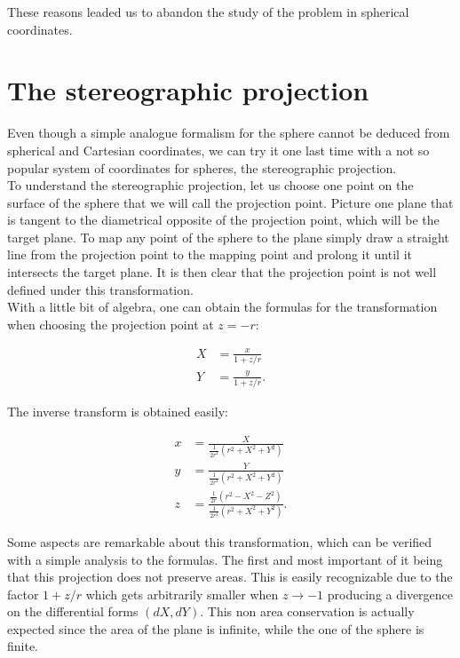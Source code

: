 These reasons leaded us to abandon the study of the problem in spherical coordinates.\\


\section{The stereographic projection}
Even though a simple analogue formalism for the sphere cannot be deduced from spherical and Cartesian coordinates, we can try it one last time with a not so popular system of coordinates for spheres, the stereographic projection.\\

To understand the stereographic projection, let us choose one point on the surface of the sphere that we will call the projection point. Picture one plane that is tangent to the diametrical opposite of the projection point, which will be the target plane. To map any point of the sphere to the plane simply draw a straight line from the projection point to the mapping point and prolong it until it intersects the target plane. It is then clear that the projection point is not well defined under this transformation.\\

With a little bit of algebra, one can obtain the formulas for the transformation when choosing the projection point at $z=-r$:

\begin{align*}
X &= \frac{x}{1+z/r}\\
Y &= \frac{y}{1+z/r}.
\end{align*}

The inverse transform is obtained easily:

\begin{align*}
x &= \frac{X}{\frac{1}{2r^2}(r^2+X^2+Y^2)}\\
y &= \frac{Y}{\frac{1}{2r^2}(r^2+X^2+Y^2)}\\
z &= \frac{\frac{1}{2r}(r^2-X^2-Z^2)}{\frac{1}{2r^2}(r^2+X^2+Y^2)}.
\end{align*}

Some aspects are remarkable about this transformation, which can be verified with a simple analysis to the formulas. The first and most important of it being that this projection does not preserve areas. This is easily recognizable due to the factor $1+z/r$ which gets arbitrarily smaller when $z\to -1$ producing a divergence on the differential forms $(dX,dY)$. This non area conservation is actually expected since the area of the plane is infinite, while the one of the sphere is finite.\\

